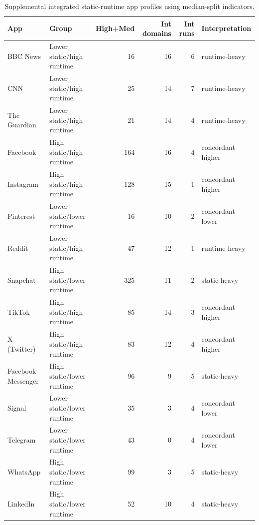 \begin{table}[!t]
\centering
\caption{Supplemental integrated static-runtime app profiles using median-split indicators.}
\label{tab:integrated-static-runtime-profiles}
\tiny
\begin{tabular}{llrrrl}
\toprule
App & Group & High+Med & Int domains & Int runs & Interpretation \\
\midrule
BBC News & Lower static/high runtime & 16 & 16 & 6 & runtime-heavy \\
CNN & Lower static/high runtime & 25 & 14 & 7 & runtime-heavy \\
The Guardian & Lower static/high runtime & 21 & 14 & 4 & runtime-heavy \\
Facebook & High static/high runtime & 164 & 16 & 4 & concordant higher \\
Instagram & High static/high runtime & 128 & 15 & 1 & concordant higher \\
Pinterest & Lower static/lower runtime & 16 & 10 & 2 & concordant lower \\
Reddit & Lower static/high runtime & 47 & 12 & 1 & runtime-heavy \\
Snapchat & High static/lower runtime & 325 & 11 & 2 & static-heavy \\
TikTok & High static/high runtime & 85 & 14 & 3 & concordant higher \\
X (Twitter) & High static/high runtime & 83 & 12 & 4 & concordant higher \\
Facebook Messenger & High static/lower runtime & 96 & 9 & 5 & static-heavy \\
Signal & Lower static/lower runtime & 35 & 3 & 4 & concordant lower \\
Telegram & Lower static/lower runtime & 43 & 0 & 4 & concordant lower \\
WhatsApp & High static/lower runtime & 99 & 3 & 5 & static-heavy \\
LinkedIn & High static/lower runtime & 52 & 10 & 4 & static-heavy \\
\bottomrule
\end{tabular}
\end{table}
